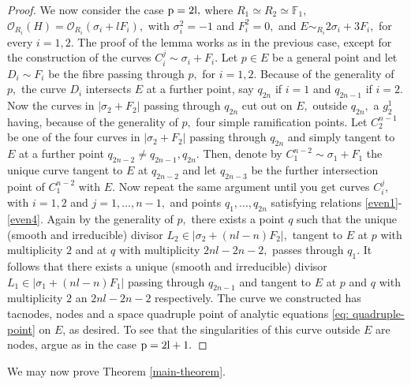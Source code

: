 \documentclass[plain]{amsart}
\def\p{\rm{p}}
\begin{document}
\begin{proof}
We now consider the case $\p=2l,$ where $R_1\simeq R_2\simeq \mathbb F_1,$
$\mathcal O_{R_i}(H)=\mathcal O_{R_i}(\sigma_i+l F_i),$ with $\sigma_i^2=-1$ and $F_i^2=0,$
and $E\sim_{R_i}2\sigma_i+3 F_i,$ for every $i=1,2.$
The proof of the lemma works  as in the previous case, except for the construction
of the curves $C_i^j\sim\sigma_i+F_i.$ Let
$p\in E$ be a general point and let $D_i\sim F_i$ be the fibre passing through $p,$ for $i=1,2.$ 
Because of the generality of $p,$
the curve $D_i$ intersects $E$ at a further point, say $q_{2n}$ if $i=1$ and $q_{2n-1}$ if $i=2.$
Now the curves in $|\sigma_2+F_2|$ passing through $q_{2n}$ cut out on $E,$
outside $q_{2n},$ a $g^1_2$ having, because of the generality of $p,$  four simple ramification
points. Let $C^{n-1}_2$ be one of the four curves in  $|\sigma_2+F_2|$ passing through $q_{2n}$
and simply tangent to $E$ at a further point $q_{2n-2}\neq q_{2n-1}, q_{2n}.$ Then, denote by 
$C_1^{n-2}\sim \sigma_1+F_1$ the unique curve tangent to $E$ at $q_{2n-2}$ and let $q_{2n-3}$ be
the further intersection point of $C^{n-2}_1$ with $E.$ Now repeat the same argument until you get 
curves $C^j_i,$ with $i=1,2$ and $j=1,...,n-1,$ and points $q_1,...,q_{2n}$ satisfying relations   
\eqref{even1}-\eqref{even4}. Again by the generality of $p,$ there exists a point $q$
such that the unique (smooth and irreducible) divisor $L_2\in |\sigma_2+(nl-n)F_2|,$ tangent
to $E$ at $p$ with multiplicity $2$ and at $q$ with multiplicity $2nl-2n-2,$ passes through $q_1.$
It follows that there exists a unique (smooth and irreducible) divisor $L_1\in |\sigma_1+(nl-n)F_1|$
passing through $q_{2n-1}$ and 
tangent to $E$ at $p$ and $q$ with multiplicity $2$ an $2nl-2n-2$ respectively. The curve we constructed has tacnodes, nodes and a space quadruple point of analytic
equations \eqref{eq: quadruple-point} on $E$, as desired. To see that the singularities of this curve outside $E$
are nodes, argue as in the case $\p=2l+1.$
 \end{proof}
 
 We may now prove Theorem \ref{main-theorem}.
\end{document}
